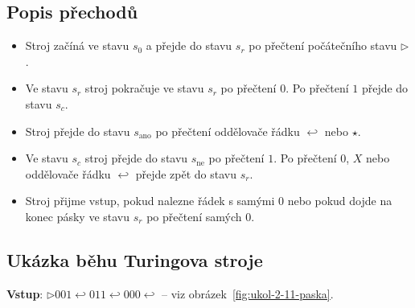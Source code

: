 \documentclass[10pt, a4paper]{ReportSheet}
\begin{document}
\begin{uloha}{11}{2}
        \subsection*{Popis přechodů}
        \begin{itemize}
            \item Stroj začíná ve stavu $s_0$ a přejde do stavu $s_r$ po přečtení počátečního stavu $\triangleright$.
            \item Ve stavu $s_r$ stroj pokračuje ve stavu $s_r$ po přečtení $0$. Po přečtení $1$ přejde do stavu $s_c$.
            \item Stroj přejde do stavu $s_{\text{ano}}$ po přečtení oddělovače řádku $\hookleftarrow$ nebo $\star$.
            \item Ve stavu $s_c$ stroj přejde do stavu $s_{\text{ne}}$ po přečtení $1$. Po přečtení $0$, $X$ nebo oddělovače řádku $\hookleftarrow$ přejde zpět do stavu $s_r$.
            \item Stroj přijme vstup, pokud nalezne řádek s samými $0$ nebo pokud dojde na konec pásky ve stavu $s_r$ po přečtení samých $0$.
        \end{itemize}

        \subsection*{Ukázka běhu Turingova stroje}
        \textbf{Vstup}: $\triangleright 001 \hookleftarrow 011 \hookleftarrow 000 \hookleftarrow$ – viz obrázek~\ref{fig:ukol-2-11-paska}.


\end{uloha}
\end{document}
